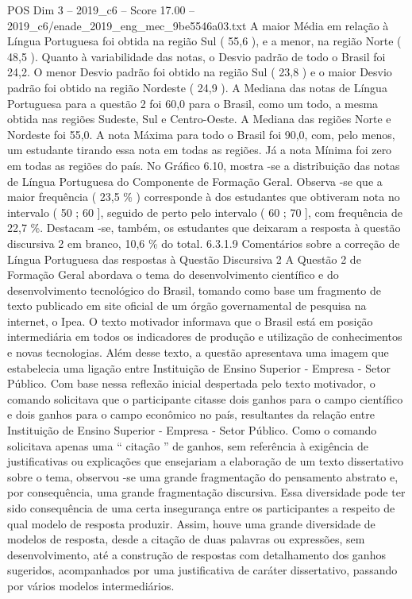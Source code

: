\begin{textsample}{POS Dim 3 – 2019\_c6 – Score 17.00 – 2019\_c6/enade\_2019\_eng\_mec\_9be5546a03.txt}
A maior Média em relação à Língua Portuguesa foi obtida na região Sul ( 55,6 ), e a menor, na região Norte ( 48,5 ).
Quanto à variabilidade das notas, o Desvio padrão de todo o Brasil foi 24,2.
O menor Desvio padrão foi obtido na região Sul ( 23,8 ) e o maior Desvio padrão foi obtido na região Nordeste ( 24,9 ).
A Mediana das notas de Língua Portuguesa para a questão 2 foi 60,0 para o Brasil, como um todo, a mesma obtida nas regiões Sudeste, Sul e Centro-Oeste.
A Mediana das regiões Norte e Nordeste foi 55,0.
A nota Máxima para todo o Brasil foi 90,0, com, pelo menos, um estudante tirando essa nota em todas as regiões.
Já a nota Mínima foi zero em todas as regiões do país.
No Gráfico 6.10, mostra -se a distribuição das notas de Língua Portuguesa do Componente de Formação Geral.
Observa -se que a maior frequência ( 23,5 \% ) corresponde à dos estudantes que obtiveram nota no intervalo ( 50 ; 60 ], seguido de perto pelo intervalo ( 60 ; 70 ], com frequência de 22,7 \%.
Destacam -se, também, os estudantes que deixaram a resposta à questão discursiva 2 em branco, 10,6 \% do total. 6.3.1.9 Comentários sobre a correção de Língua Portuguesa das respostas à Questão Discursiva 2 A Questão 2 de Formação Geral abordava o tema do desenvolvimento científico e do desenvolvimento tecnológico do Brasil, tomando como base um fragmento de texto publicado em site oficial de um órgão governamental de pesquisa na internet, o Ipea.
O texto motivador informava que o Brasil está em posição intermediária em todos os indicadores de produção e utilização de conhecimentos e novas tecnologias.
Além desse texto, a questão apresentava uma imagem que estabelecia uma ligação entre Instituição de Ensino Superior - Empresa - Setor Público.
Com base nessa reflexão inicial despertada pelo texto motivador, o comando solicitava que o participante citasse dois ganhos para o campo científico e dois ganhos para o campo econômico no país, resultantes da relação entre Instituição de Ensino Superior - Empresa - Setor Público.
Como o comando solicitava apenas uma “ citação ” de ganhos, sem referência à exigência de justificativas ou explicações que ensejariam a elaboração de um texto dissertativo sobre o tema, observou -se uma grande fragmentação do pensamento abstrato e, por consequência, uma grande fragmentação discursiva.
Essa diversidade pode ter sido consequência de uma certa insegurança entre os participantes a respeito de qual modelo de resposta produzir.
Assim, houve uma grande diversidade de modelos de resposta, desde a citação de duas palavras ou expressões, sem desenvolvimento, até a construção de respostas com detalhamento dos ganhos sugeridos, acompanhados por uma justificativa de caráter dissertativo, passando por vários modelos intermediários.

\end{textsample}
